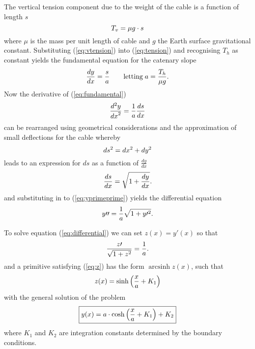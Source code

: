 \documentclass[11pt]{amsart}
\DeclareMathOperator{\arcsinh}{arcsinh}
\begin{document}
The vertical tension component due to the weight of the cable is a function of length $s$
\begin{equation}
	\centering
	T_{v}=\mu g \cdot s
	\label{eq:vtension}
\end{equation}
where $\mu$ is the mass per unit length of cable and $g$ the Earth surface gravitational constant.
Substituting (\ref{eq:vtension}) into (\ref{eq:tension}) and recognising $T_h$ as constant yields the fundamental equation for the catenary slope
\begin{equation}
	\centering
	\frac{dy}{dx} = \frac{s}{a} \qquad \text{letting} \; a=\frac{T_h}{\mu g}.
	\label{eq:fundamental}
\end{equation}
Now the derivative of (\ref{eq:fundamental}) 
\begin{equation}
	\centering
	\frac{d^{2}y}{{dx}^2}=\frac{1}{a}\frac{ds}{dx}
	\label{eq:yprimeprime}
\end{equation}
can be rearranged using geometrical considerations and the approximation of small deflections for the cable whereby
\begin{equation}
	\centering
	ds^2=dx^2+dy^2
	\label{eq:elemental}
\end{equation}
leads to an expression for $ds$ as a function of $\frac{dy}{dx}$
\begin{equation}
	\centering
	\frac{ds}{dx} = \sqrt{1 + \frac{dy}{dx}}.
	\label{eq:ds}
\end{equation}
and substituting in to (\ref{eq:yprimeprime}) yields the differential equation 
\begin{equation}
	\centering
	y \prime \prime =\frac{1}{a} \sqrt{1 + y\prime ^2}.
	\label{eq:differential}
\end{equation}

To solve equation (\ref{eq:differential}) we can set $z(x)=y\prime(x)$ so that
\begin{equation}
	\centering
	\frac{z \prime}{\sqrt{1+z^2}} =\frac{1}{a}.
	\label{eq:z}
\end{equation}
and a primitive satisfying (\ref{eq:z}) has the form $\arcsinh{z(x)}$, such that
\begin{equation}
	\centering
	z(x)=\sinh \left(\frac{x}{a} + K_1 \right)
	\label{eq:z(x)}
\end{equation}
with the general solution of the problem
\begin{equation}
	\centering
	\boxed{y(x)=a \cdot \cosh \left(\frac{x}{a} + K_1 \right) + K_2}
	\label{eq:solution}
\end{equation}
where $K_1$ and $K_2$ are integration constants determined by the boundary conditions.
\end{document}
